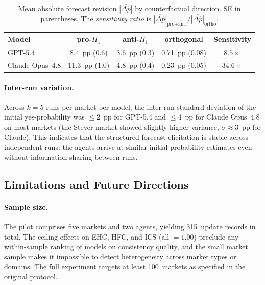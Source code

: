 \begin{table}[h]
\centering
\caption{Mean absolute forecast revision $\overline{|\Delta\hat{p}|}$ by counterfactual direction.
SE in parentheses.  The \emph{sensitivity ratio} is $\overline{|\Delta\hat{p}|}_{\text{pro+anti}}
/ \overline{|\Delta\hat{p}|}_{\text{ortho}}$.}
\label{tab:anchoring}
\begin{tabular}{lcccc}
\toprule
\textbf{Model} & pro-$H_1$ & anti-$H_1$ & orthogonal & \textbf{Sensitivity} \\
\midrule
GPT-5.4         & 8.4~pp (0.6) & 3.6~pp (0.3) & 0.71~pp (0.08) & $8.5\times$ \\
Claude Opus~4.8 & 11.3~pp (1.0) & 4.8~pp (0.4) & 0.23~pp (0.05) & $34.6\times$ \\
\bottomrule
\end{tabular}
\end{table}

\paragraph{Inter-run variation.}
Across $k = 5$ runs per market per model, the inter-run standard deviation of the initial
yes-probability was $\leq 2$~pp for GPT-5.4 and $\leq 4$~pp for Claude Opus~4.8 on most
markets (the Steyer market showed slightly higher variance, $\sigma \approx 3$~pp for Claude).
This indicates that the structured-forecast elicitation is stable across independent runs:
the agents arrive at similar initial probability estimates even without information sharing
between runs.

\subsection{Limitations and Future Directions}
\label{app:exp1-limitations}

\paragraph{Sample size.}
The pilot comprises five markets and two agents, yielding 315~update records in total.  The
ceiling effects on EHC, HFC, and ICS (all $= 1.00$) preclude any within-sample ranking of
models on consistency quality, and the small market sample makes it impossible to detect
heterogeneity across market types or domains.  The full experiment targets at least 100~markets
as specified in the original protocol.

